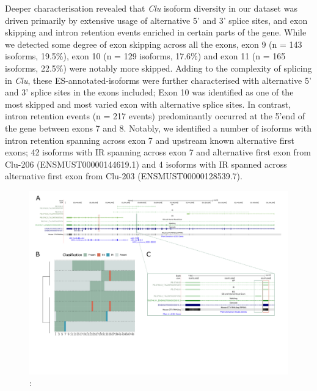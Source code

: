 Deeper characterisation revealed that \textit{Clu} isoform diversity in our dataset was driven primarily by extensive usage of alternative 5' and 3' splice sites, and exon skipping and intron retention events enriched in certain parts of the gene. While we detected some degree of exon skipping across all the exons, exon 9 (n = 143 isoforms, 19.5\%), exon 10 (n = 129 isoforms, 17.6\%) and exon 11 (n = 165 isoforms, 22.5\%) were notably more skipped. Adding to the complexity of splicing in \textit{Clu}, these ES-annotated-isoforms were further characterised with alternative 5' and 3' splice sites in the exons included; Exon 10 was identified as one of the most skipped and most varied exon with alternative splice sites. In contrast, intron retention events (n = 217 events) predominantly occurred at the 5'end of the gene between exons 7 and 8. Notably, we identified a number of isoforms with intron retention spanning across exon 7 and upstream known alternative first exons; 42 isoforms with IR spanning across exon 7 and alternative first exon from Clu-206 (ENSMUST00000144619.1) and 4 isoforms with IR spanned across alternative first exon from Clu-203 (ENSMUST00000128539.7). 

\begin{landscape}
	\begin{figure}[htp]
		\begin{center}
			\includegraphics[page=6,trim={0 1cm 0 0},scale = 0.85]{Figures/TargetGenes_Annotation_Landscape.pdf}
		\end{center}
		\captionsetup{width=0.95\textwidth}
		\caption[RNA-Seq defined transcriptome]%
		{\textbf{}: }   
		\label{fig:clu}
	\end{figure}
\end{landscape}

